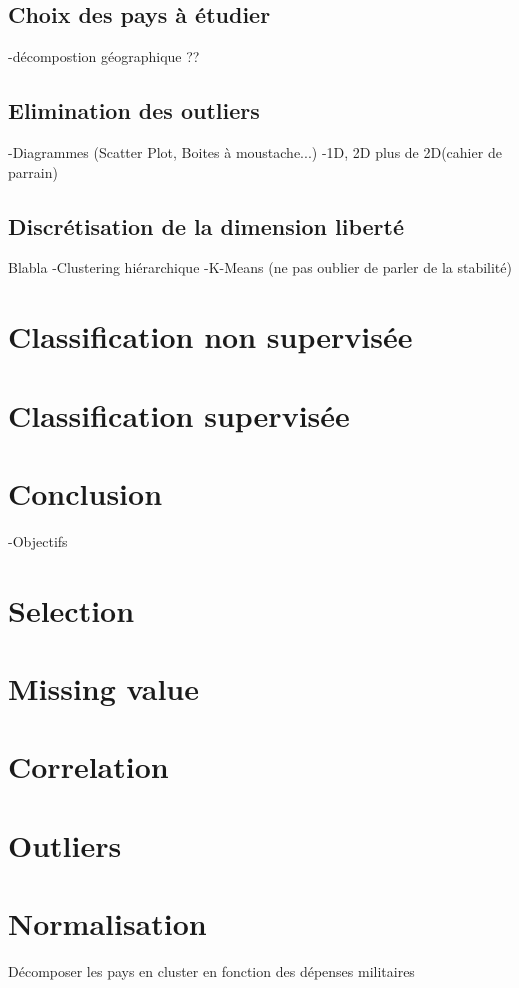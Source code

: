 \subsection{Choix des pays à étudier}
-décompostion géographique ??

\subsection{Elimination des outliers}
-Diagrammes (Scatter Plot, Boites à moustache...)
-1D, 2D plus de 2D(cahier de parrain)
\subsection{Discrétisation de la dimension \og liberté \fg}
Blabla
-Clustering hiérarchique
-K-Means (ne pas oublier de parler de la stabilité)
\section{Classification non supervisée}
\section{Classification supervisée}
\section{Conclusion}



	
-Objectifs

\section{Selection}

\section{Missing value}
\section{Correlation}
\section{Outliers}

\section{Normalisation}


Décomposer les pays en cluster en fonction des dépenses militaires


